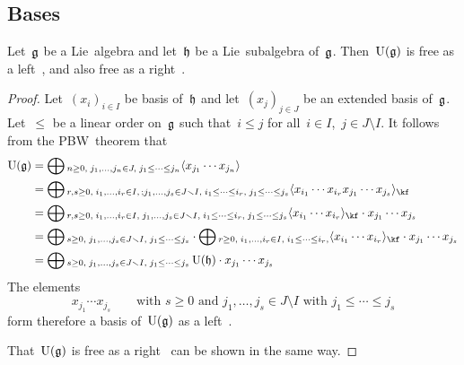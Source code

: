\subsection{Bases}

\begin{proposition}
	Let~$\mathfrak{g}$ be a Lie~algebra and let~$\hlie$ be a Lie~subalgebra of~$\mathfrak{g}$.
	Then~$\operatorname{U}(\mathfrak{g})$ is free as a left~\module{$\Univ(\hlie)$}, and also free as a right~\module{$\Univ(\hlie)$}.
\end{proposition}


\begin{proof}
	Let~$(x_i)_{i \in I}$ be basis of~$\hlie$ and let~$(x_j)_{j \in J}$ be an extended basis of~$\mathfrak{g}$.
	Let~$\leq$ be a linear order on~$\mathfrak{g}$ such that~$i \leq j$ for all~$i \in I$,~$j \in J \setminus I$.
	It follows from the PBW~theorem that
	\begin{align*}
		\Univ(\glie)
		&=
		\bigoplus{}_{
			n \geq 0, \;
			j_1, \dotsc, j_n \in J, \;
			j_1 \leq \dotsb \leq j_n
		}
		\gen{ x_{j_1} \dotsm x_{j_n} }
		\\
		&=
		\bigoplus{}_{
			r, s \geq 0, \;
			i_1, \dotsc, i_r \in I, \,;
			j_1, \dotsc, j_s \in J \setminus I, \;
			i_1 \leq \dotsb \leq i_r,\;
			j_1 \leq \dotsb \leq j_s
		}
		\gen{ x_{i_1} \dotsm x_{i_r} x_{j_1} \dotsm x_{j_s} }_{\kf}
		\\
		&=
		\bigoplus{}_{
			r, s \geq 0, \;
			i_1, \dotsc, i_r \in I, \;
			j_1, \dotsc, j_s \in J \setminus I, \;
			i_1 \leq \dotsb \leq i_r, \;
			j_1 \leq \dotsb \leq j_s
		}
		\gen{ x_{i_1} \dotsm x_{i_r} }_{\kf}
		\cdot x_{j_1} \dotsm x_{j_s}
		\\
		&=
		\bigoplus{}_{
			s \geq 0, \;
			j_1, \dotsc, j_s \in J \setminus I, \;
			j_1 \leq \dotsb \leq j_s
		}
		\cdot
		\bigoplus{}_{
			r \geq 0, \;
			i_1, \dotsc, i_r \in I, \;
			i_1 \leq \dotsb \leq i_r,
		}
		\gen{ x_{i_1} \dotsm x_{i_r} }_{\kf}
		\cdot x_{j_1} \dotsm x_{j_s}
		\\
		&=
		\bigoplus{}_{
			s \geq 0, \;
			j_1, \dotsc, j_s \in J \setminus I, \;
			j_1 \leq \dotsb \leq j_s
		}
		\Univ(\hlie)
		\cdot x_{j_1} \dotsm x_{j_s}
	\end{align*}
	The elements
	\[
		x_{j_1} \dotsm x_{j_s}
		\qquad
		\text{with~$s \geq 0$ and~$j_1, \dotsc, j_s \in J \setminus I$ with~$j_1 \leq \dotsb \leq j_s$}
	\]
	form therefore a basis of~$\operatorname{U}(\mathfrak{g})$ as a left~\module{$\Univ(\hlie)$}.
	
	That~$\operatorname{U}(\mathfrak{g})$ is free as a right~\module{$\hlie$} can be shown in the same way.
\end{proof}


